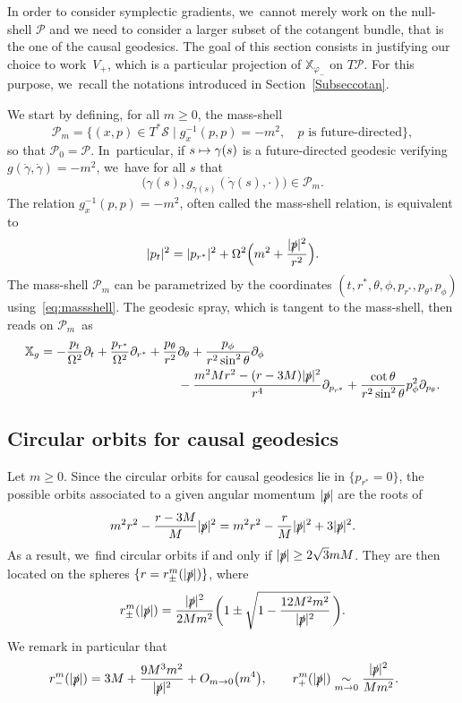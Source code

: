 \documentclass[JEP,XML,SOM,Unicode,published]{cedram}
\newcommand\mto{\mathchoice{\longmapsto}{\mapsto}{\mapsto}{\mapsto}}
\theoremstyle{plain}
\theoremstyle{definition}
\newcommand{\isEquivTo}[1]{\underset{#1}{\sim}}
\newcommand\T{{\mathbb{X}}}
\begin{document}
In order to consider symplectic gradients, we~cannot merely work on the null-shell $\mathcal{P}$ and we need to consider a larger subset of the cotangent bundle, that is the one of the causal geodesics. The goal of this section consists in justifying our choice to work~$V_+$, which is a particular projection of $\T_{\varphi_-}$ on $T \mathcal{P}$. For this purpose, we~recall the notations introduced in Section~\ref{Subseccotan}.

We start by defining, for all $m \geq 0$, the mass-shell
\[
\mathcal{P}_m= \bigl\{ (x,p)\in T^*\mathcal{S}\mid g_x^{-1}(p,p)=-m^2, \; \text{ $p$ is future-directed} \bigr\},
\]
so that $\mathcal{P}_0=\mathcal{P}$. In~particular, if $s \mto \gamma (s)$ is a future-directed geodesic verifying $g(\dot{\gamma},\dot{\gamma})=-m^2$, we~have for all $s$ that
\[
\bigl(\gamma(s),g_{\gamma(s)}(\dot{\gamma}(s),\cdot) \bigr) \in \mathcal{P}_m.
\]
The relation $g_x^{-1}(p,p)=-m^2$, often called the mass-shell relation, is equivalent to
\begin{equation}\label{eq:massshell}
|p_t|^2=|p_{r^*}|^2+\Omega^2\Bigl(m^2+\frac{|\slashed{p}|^2}{r^2}\Bigr).
\end{equation}
The mass-shell $\mathcal{P}_m$ can be parametrized by the coordinates $(t,r^*,\theta,\phi, p_{r^*},p_\theta,p_\phi)$ using~\eqref{eq:massshell}. The geodesic spray, which is tangent to the mass-shell, then reads on $\mathcal{P}_m$~as
\begin{align}\label{eq:Vlamassm}
\mathbb{X}_{g} =-\frac{p_t}{\Omega^2} \partial_t + \frac{p_{r^*}}{\Omega^2} \partial_{r^*}+\frac{p_{\theta}}{r^2} &\partial_{\theta} + \frac{p_{\phi}}{r^2 \sin^2 \theta } \partial_{\phi} \\
&-\frac{m^2Mr^2-(r-3M)|\slashed{p}|^2}{r^4} \partial_{p_{r^*} }+\frac{\cot \theta }{r^2 \sin^2 \theta} p_{\phi}^2 \partial_{p_{\theta}}.\notag
\end{align}

\subsection{Circular orbits for causal geodesics}

Let $m \geq 0$. Since the circular orbits for causal geodesics lie in $\{ p_{r^*} =0 \}$, the possible orbits associated to a given angular momentum $|\slashed{p}|$ are the roots of
\[
m^2r^2-\frac{r-3M}{M}|\slashed{p}|^2= m^2 r^2-\frac{r}{M}|\slashed{p}|^2+3|\slashed{p}|^2.
\]
As a result, we~find circular orbits if and only if $|\slashed{p}|\geq 2\sqrt{3}m M$. They are then located on the spheres $\{r=r_{\pm}^{m}(|\slashed{p}|)\}$, where
\begin{equation}\label{eq:defrpm}
r_{\pm}^{m}(|\slashed{p}|)=\frac{|\slashed{p}|^2}{2Mm^2}\biggl(1\pm \sqrt{1-\frac{12M^2m^2}{|\slashed{p}|^2}} \, \biggr).
\end{equation}
We remark in particular that
\begin{equation}\label{eq:equirminus}
\hspace{-5mm} r_{-}^{m}(|\slashed{p}|) = 3M+\frac{9M^3m^2}{|\slashed{p}|^2} +O_{m \to 0} \bigl(m^4 \bigr),\qquad r_+^m (|\slashed{p}|) \isEquivTo{m \to 0} \frac{|\slashed{p}|^2}{Mm^2}.
\end{equation}
\end{document}
